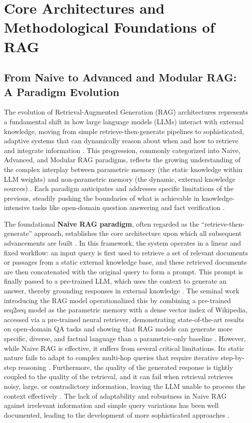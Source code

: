 \documentclass[11pt]{article}
\begin{document}
\section{Core Architectures and Methodological Foundations of RAG}

\subsection{From Naive to Advanced and Modular RAG: A Paradigm Evolution}

The evolution of Retrieval-Augmented Generation (RAG) architectures represents a fundamental shift in how large language models (LLMs) interact with external knowledge, moving from simple retrieve-then-generate pipelines to sophisticated, adaptive systems that can dynamically reason about when and how to retrieve and integrate information \cite{ref23}. This progression, commonly categorized into Naive, Advanced, and Modular RAG paradigms, reflects the growing understanding of the complex interplay between parametric memory (the static knowledge within LLM weights) and non-parametric memory (the dynamic, external knowledge sources) \cite{ref23,ref22}. Each paradigm anticipates and addresses specific limitations of the previous, steadily pushing the boundaries of what is achievable in knowledge-intensive tasks like open-domain question answering and fact verification \cite{ref23}.

The foundational \textbf{Naive RAG paradigm}, often regarded as the ``retrieve-then-generate'' approach, establishes the core architecture upon which all subsequent advancements are built \cite{ref23}. In this framework, the system operates in a linear and fixed workflow: an input query is first used to retrieve a set of relevant documents or passages from a static external knowledge base, and these retrieved documents are then concatenated with the original query to form a prompt. This prompt is finally passed to a pre-trained LLM, which uses the context to generate an answer, thereby grounding responses in external knowledge \cite{ref22}. The seminal work introducing the RAG model operationalized this by combining a pre-trained seq2seq model as the parametric memory with a dense vector index of Wikipedia, accessed via a pre-trained neural retriever, demonstrating state-of-the-art results on open-domain QA tasks and showing that RAG models can generate more specific, diverse, and factual language than a parametric-only baseline \cite{ref22}. However, while Naive RAG is effective, it suffers from several critical limitations. Its static nature fails to adapt to complex multi-hop queries that require iterative step-by-step reasoning \cite{ref39,ref49}. Furthermore, the quality of the generated response is tightly coupled to the quality of the retrieval, and it can fail when retrieval retrieves noisy, large, or contradictory information, leaving the LLM unable to process the context effectively \cite{ref40,ref50}. The lack of adaptability and robustness in Naive RAG against irrelevant information and simple query variations has been well documented, leading to the development of more sophisticated approaches \cite{ref50,ref51}.
\end{document}
